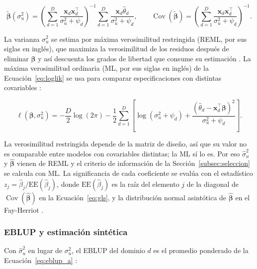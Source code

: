 \begin{equation}
    \tilde{\boldsymbol{\beta}}(\sigma_u^2) = \left(\sum_{d=1}^{D} \frac{\mathbf{x}_d \mathbf{x}_d^\top}{\sigma_u^2 + \psi_d}\right)^{-1} \sum_{d=1}^{D} \frac{\mathbf{x}_d \hat{\theta}_d}{\sigma_u^2 + \psi_d}, \qquad \operatorname{Cov}(\tilde{\boldsymbol{\beta}}) = \left(\sum_{d=1}^{D} \frac{\mathbf{x}_d \mathbf{x}_d^\top}{\sigma_u^2 + \psi_d}\right)^{-1}.
    \label{eq:gls}
\end{equation}

La varianza $\sigma_u^2$ se estima por máxima verosimilitud restringida (REML, por sus siglas en inglés), que maximiza la verosimilitud de los residuos después de eliminar $\boldsymbol{\beta}$ y así descuenta los grados de libertad que consume su estimación \cite[pp.~434--437]{morales2021smallarea}. La máxima verosimilitud ordinaria (ML, por sus siglas en inglés) de la Ecuación~\ref{eq:loglik} se usa para comparar especificaciones con distintas covariables \cite[pp.~432--433]{morales2021smallarea}:

\begin{equation}
    \ell(\boldsymbol{\beta}, \sigma_u^2) = -\frac{D}{2}\log(2\pi) - \frac{1}{2}\sum_{d=1}^{D}\left[\log(\sigma_u^2 + \psi_d) + \frac{(\hat{\theta}_d - \mathbf{x}_d^\top\boldsymbol{\beta})^2}{\sigma_u^2 + \psi_d}\right].
    \label{eq:loglik}
\end{equation}

La verosimilitud restringida depende de la matriz de diseño, así que su valor no es comparable entre modelos con covariables distintas; la ML sí lo es. Por eso $\hat{\sigma}_u^2$ y $\hat{\boldsymbol{\beta}}$ vienen de REML y el criterio de información de la Sección~\ref{subsec:seleccion} se calcula con ML. La significancia de cada coeficiente se evalúa con el estadístico $z_j = \hat{\beta}_j / \text{EE}(\hat{\beta}_j)$, donde $\text{EE}(\hat{\beta}_j)$ es la raíz del elemento $j$ de la diagonal de $\operatorname{Cov}(\hat{\boldsymbol{\beta}})$ en la Ecuación~\ref{eq:gls}, y la distribución normal asintótica de $\hat{\boldsymbol{\beta}}$ en el Fay-Herriot \cite[pp.~434, 456]{morales2021smallarea}.

\subsubsection{EBLUP y estimación sintética}

Con $\hat{\sigma}_u^2$ en lugar de $\sigma_u^2$, el EBLUP del dominio $d$ es el promedio ponderado de la Ecuación~\ref{eq:eblup_a} \cite[p.~427]{morales2021smallarea}:

